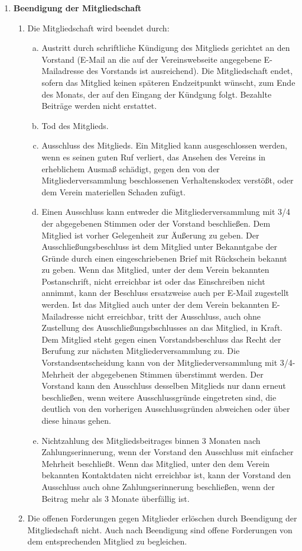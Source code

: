\documentclass{article}
\begin{document}
\begin{enumerate}[§ 1.]
\item \textsf{\textbf{Beendigung der Mitgliedschaft}}
	\begin{enumerate}[1.]
	\item Die Mitgliedschaft wird beendet durch:
		\begin{enumerate}[a.]
		\item Austritt durch schriftliche Kündigung des Mitglieds gerichtet an den Vorstand (E-Mail an die auf der Vereinswebseite angegebene E-Mailadresse des Vorstands ist ausreichend).
		Die Mitgliedschaft endet, sofern das Mitglied keinen späteren Endzeitpunkt wünscht,
		zum Ende des Monats, der auf den Eingang der Kündgung folgt.
		Bezahlte Beiträge werden nicht erstattet.
		\item Tod des Mitglieds.
		\item Ausschluss des Mitglieds. Ein Mitglied kann ausgeschlossen werden, wenn es seinen guten Ruf verliert, das Ansehen des Vereins in erheblichem Ausmaß schädigt, gegen den von der Mitgliederversammlung beschlossenen Verhaltenskodex verstößt, oder dem Verein materiellen Schaden zufügt.
		\item Einen Ausschluss kann entweder die Mitgliederversammlung mit 3/4 der abgegebenen Stimmen oder  der Vorstand beschließen.
Dem Mitglied ist vorher Gelegenheit zur Äußerung zu geben.
Der Ausschließungsbeschluss ist dem Mitglied unter Bekanntgabe der Gründe durch einen eingeschriebenen Brief mit Rückschein bekannt zu geben.
Wenn das Mitglied, unter der dem Verein bekannten Postanschrift, nicht erreichbar ist oder das Einschreiben nicht annimmt, kann der Beschluss ersatzweise auch per E-Mail zugestellt werden.
Ist das Mitglied auch unter der dem Verein bekannten E-Mailadresse nicht erreichbar, tritt der Ausschluss, auch ohne Zustellung des Ausschließungsbschlusses an das Mitglied, in Kraft.
Dem Mitglied steht gegen einen Vorstandsbeschluss das Recht der Berufung zur nächsten Mitgliederversammlung zu.
Die Vorstandsentscheidung kann von der Mitgliederversammlung mit 3/4-Mehrheit der abgegebenen Stimmen überstimmt werden.
Der Vorstand kann den Ausschluss desselben Mitglieds nur dann erneut beschließen, wenn weitere Ausschlussgründe eingetreten sind, die deutlich von den vorherigen Ausschlussgründen abweichen oder über diese hinaus gehen.
		\item Nichtzahlung des Mitgliedsbeitrages binnen 3 Monaten nach Zahlungserinnerung, wenn der Vorstand den Ausschluss mit einfacher Mehrheit beschließt. Wenn das Mitglied, unter den dem Verein bekannten Kontaktdaten nicht erreichbar ist, kann der Vorstand den Ausschluss auch ohne Zahlungserinnerung beschließen, wenn der Beitrag mehr als 3 Monate überfällig ist.
		\end{enumerate}
	\item Die offenen Forderungen gegen Mitglieder erlöschen durch Beendigung der Mitgliedschaft nicht.
	Auch nach Beendigung sind offene Forderungen von dem entsprechenden Mitglied zu begleichen.
	\end{enumerate}
	

\end{enumerate}
\end{document}
